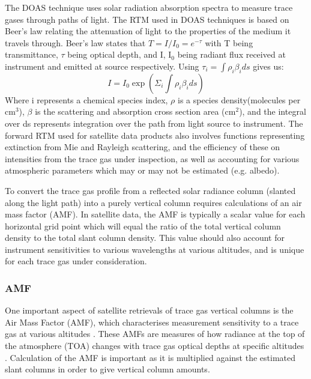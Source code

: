       
      The DOAS technique uses solar radiation absorption spectra to measure trace gases through paths of light.
      The RTM used in DOAS techniques is based on Beer's law relating the attenuation of light to the properties of the medium it travels through.
      Beer's law states that $ T = I/I_0 = e^{-\tau} $ with T being transmittance, $\tau$ being optical depth, and I, I$_0$ being radiant flux received at instrument and emitted at source respectively.
      Using 
      $ \tau_i = \int \rho_i \beta_i ds $ gives us:
      $$ I = I_0 \exp {\left( \Sigma_i \int \rho_i \beta_i ds \right) } $$
      Where i represents a chemical species index, $\rho$ is a species density(molecules per cm$^3$), $\beta$ is the scattering and absorption cross section area (cm$^2$), and the integral over ds represents integration over the path from light source to instrument.
      The forward RTM used for satellite data products also involves functions representing extinction from Mie and Rayleigh scattering, and the efficiency of these on intensities from the trace gas under inspection, as well as accounting for various atmospheric parameters which may or may not be estimated (e.g. albedo).
      
      To convert the trace gas profile from a reflected solar radiance column (slanted along the light path) into a purely vertical column requires calculations of an air mass factor (AMF).
      In satellite data, the AMF is typically a scalar value for each horizontal grid point which will equal the ratio of the total vertical column density to the total slant column density. This value should also account for instrument sensitivities to various wavelengths at various altitudes, and is unique for each trace gas under consideration.
    
    \subsubsection{AMF}
      One important aspect of satellite retrievals of trace gas vertical columns is the Air Mass Factor (AMF), which characterises measurement sensitivity to a trace gas at various altitudes \cite[e.g.]{Palmer2001}.
      These AMFs are measures of how radiance at the top of the atmosphere (TOA) changes with trace gas optical depths at specific altitudes \citep{Lorente2017}.
      Calculation of the AMF is important as it is multiplied against the estimated slant columns in order to give vertical column amounts.


